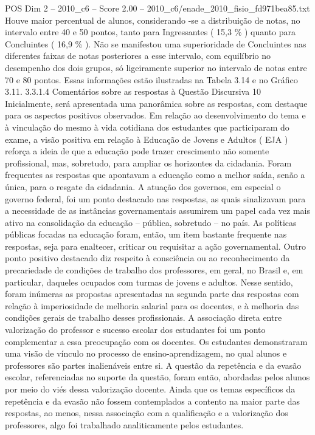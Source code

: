 \begin{textsample}{POS Dim 2 – 2010\_c6 – Score 2.00 – 2010\_c6/enade\_2010\_fisio\_fd971bea85.txt}
Houve maior percentual de alunos, considerando -se a distribuição de notas, no intervalo entre 40 e 50 pontos, tanto para Ingressantes ( 15,3 \% ) quanto para Concluintes ( 16,9 \% ).
Não se manifestou uma superioridade de Concluintes nas diferentes faixas de notas posteriores a esse intervalo, com equilíbrio no desempenho dos dois grupos, só ligeiramente superior no intervalo de notas entre 70 e 80 pontos.
Essas informações estão ilustradas na Tabela 3.14 e no Gráfico 3.11. 3.3.1.4 Comentários sobre as respostas à Questão Discursiva 10 Inicialmente, será apresentada uma panorâmica sobre as respostas, com destaque para os aspectos positivos observados.
Em relação ao desenvolvimento do tema e à vinculação do mesmo à vida cotidiana dos estudantes que participaram do exame, a visão positiva em relação à Educação de Jovens e Adultos ( EJA ) reforça a ideia de que a educação pode trazer crescimento não somente profissional, mas, sobretudo, para ampliar os horizontes da cidadania.
Foram frequentes as respostas que apontavam a educação como a melhor saída, senão a única, para o resgate da cidadania.
A atuação dos governos, em especial o governo federal, foi um ponto destacado nas respostas, as quais sinalizavam para a necessidade de as instâncias governamentais assumirem um papel cada vez mais ativo na consolidação da educação – pública, sobretudo – no país.
As políticas públicas focadas na educação foram, então, um item bastante frequente nas respostas, seja para enaltecer, criticar ou requisitar a ação governamental.
Outro ponto positivo destacado diz respeito à consciência ou ao reconhecimento da precariedade de condições de trabalho dos professores, em geral, no Brasil e, em particular, daqueles ocupados com turmas de jovens e adultos.
Nesse sentido, foram inúmeras as propostas apresentadas na segunda parte das respostas com relação à imperiosidade de melhoria salarial para os docentes, e à melhoria das condições gerais de trabalho desses profissionais.
A associação direta entre valorização do professor e sucesso escolar dos estudantes foi um ponto complementar a essa preocupação com os docentes.
Os estudantes demonstraram uma visão de vínculo no processo de ensino-aprendizagem, no qual alunos e professores são partes inalienáveis entre si.
A questão da repetência e da evasão escolar, referenciadas no suporte da questão, foram então, abordadas pelos alunos por meio do viés dessa valorização docente.
Ainda que os temas específicos da repetência e da evasão não fossem contemplados a contento na maior parte das respostas, ao menos, nessa associação com a qualificação e a valorização dos professores, algo foi trabalhado analiticamente pelos estudantes.

\end{textsample}
